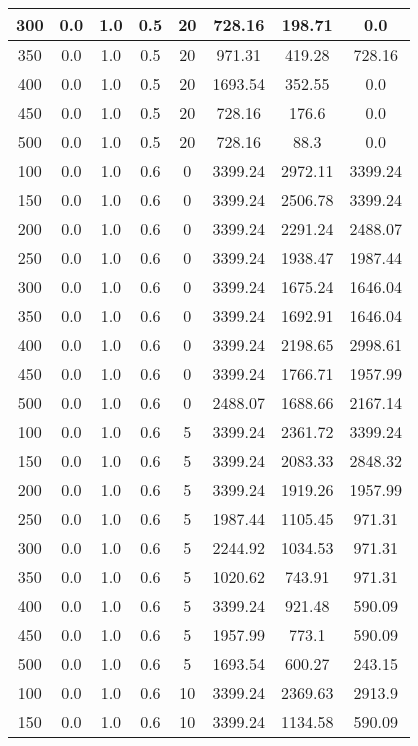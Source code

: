 \documentclass[a4paper, 12pt]{extreport}
\begin{document}
\begin{itemize}
\begin{longtable}{|c|c|c|c|c|c|c|c|}
			300 & 0.0 & 1.0 & 0.5 & 20 & 728.16 & 198.71 & 0.0 \\\hline
			350 & 0.0 & 1.0 & 0.5 & 20 & 971.31 & 419.28 & 728.16 \\\hline
			400 & 0.0 & 1.0 & 0.5 & 20 & 1693.54 & 352.55 & 0.0 \\\hline
			450 & 0.0 & 1.0 & 0.5 & 20 & 728.16 & 176.6 & 0.0 \\\hline
			500 & 0.0 & 1.0 & 0.5 & 20 & 728.16 & 88.3 & 0.0 \\\hline
			100 & 0.0 & 1.0 & 0.6 & 0 & 3399.24 & 2972.11 & 3399.24 \\\hline
			150 & 0.0 & 1.0 & 0.6 & 0 & 3399.24 & 2506.78 & 3399.24 \\\hline
			200 & 0.0 & 1.0 & 0.6 & 0 & 3399.24 & 2291.24 & 2488.07 \\\hline
			250 & 0.0 & 1.0 & 0.6 & 0 & 3399.24 & 1938.47 & 1987.44 \\\hline
			300 & 0.0 & 1.0 & 0.6 & 0 & 3399.24 & 1675.24 & 1646.04 \\\hline
			350 & 0.0 & 1.0 & 0.6 & 0 & 3399.24 & 1692.91 & 1646.04 \\\hline
			400 & 0.0 & 1.0 & 0.6 & 0 & 3399.24 & 2198.65 & 2998.61 \\\hline
			450 & 0.0 & 1.0 & 0.6 & 0 & 3399.24 & 1766.71 & 1957.99 \\\hline
			500 & 0.0 & 1.0 & 0.6 & 0 & 2488.07 & 1688.66 & 2167.14 \\\hline
			100 & 0.0 & 1.0 & 0.6 & 5 & 3399.24 & 2361.72 & 3399.24 \\\hline
			150 & 0.0 & 1.0 & 0.6 & 5 & 3399.24 & 2083.33 & 2848.32 \\\hline
			200 & 0.0 & 1.0 & 0.6 & 5 & 3399.24 & 1919.26 & 1957.99 \\\hline
			250 & 0.0 & 1.0 & 0.6 & 5 & 1987.44 & 1105.45 & 971.31 \\\hline
			300 & 0.0 & 1.0 & 0.6 & 5 & 2244.92 & 1034.53 & 971.31 \\\hline
			350 & 0.0 & 1.0 & 0.6 & 5 & 1020.62 & 743.91 & 971.31 \\\hline
			400 & 0.0 & 1.0 & 0.6 & 5 & 3399.24 & 921.48 & 590.09 \\\hline
			450 & 0.0 & 1.0 & 0.6 & 5 & 1957.99 & 773.1 & 590.09 \\\hline
			500 & 0.0 & 1.0 & 0.6 & 5 & 1693.54 & 600.27 & 243.15 \\\hline
			100 & 0.0 & 1.0 & 0.6 & 10 & 3399.24 & 2369.63 & 2913.9 \\\hline
			150 & 0.0 & 1.0 & 0.6 & 10 & 3399.24 & 1134.58 & 590.09 \\\hline

\end{longtable}
\end{itemize}
\end{document}
